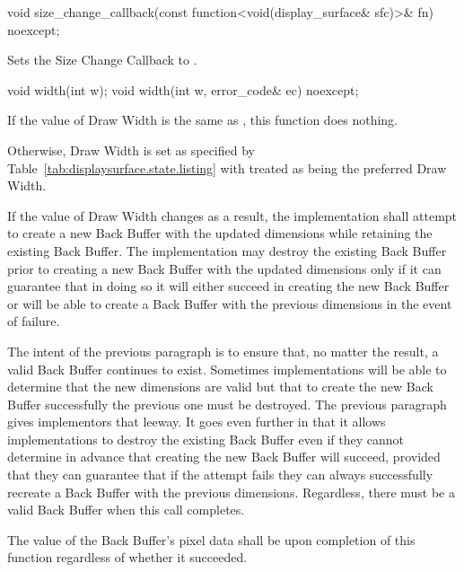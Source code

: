 \begin{itemdecl}
void size_change_callback(const function<void(display_surface& sfc)>& fn)
  noexcept;
\end{itemdecl}
\begin{itemdescr}
\pnum
\effects
Sets the Size Change Callback to .
\end{itemdescr}

\begin{itemdecl}
void width(int w);
void width(int w, error_code& ec) noexcept;
\end{itemdecl}
\begin{itemdescr}
\pnum
\effects
If the value of Draw Width is the same as , this function does nothing.

\pnum
Otherwise, Draw Width is set as specified by Table~\ref{tab:displaysurface.state.listing} with  treated as being the preferred Draw Width.

\pnum
If the value of Draw Width changes as a result, the implementation shall attempt to create a new Back Buffer with the updated dimensions while retaining the existing Back Buffer. The implementation may destroy the existing Back Buffer prior to creating a new Back Buffer with the updated dimensions only if it can guarantee that in doing so it will either succeed in creating the new Back Buffer or will be able to create a Back Buffer with the previous dimensions in the event of failure.

\pnum
\enternote
The intent of the previous paragraph is to ensure that, no matter the result, a valid Back Buffer continues to exist. Sometimes implementations will be able to determine that the new dimensions are valid but that to create the new Back Buffer successfully the previous one must be destroyed. The previous paragraph gives implementors that leeway. It goes even further in that it allows implementations to destroy the existing Back Buffer even if they cannot determine in advance that creating the new Back Buffer will succeed, provided that they can guarantee that if the attempt fails they can always successfully recreate a Back Buffer with the previous dimensions. Regardless, there must be a valid Back Buffer when this call completes.
\exitnote

\pnum
The value of the Back Buffer's pixel data shall be \unspecnorm upon completion of this function regardless of whether it succeeded.


\end{itemdescr}
